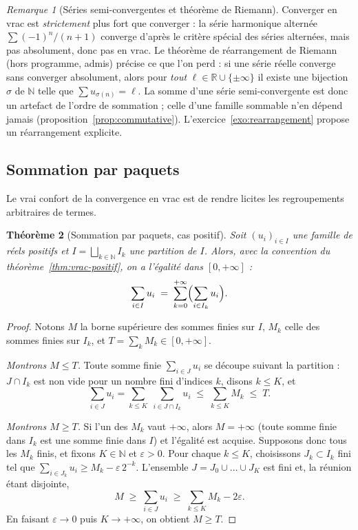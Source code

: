 \documentclass[11pt,a4paper]{article}
\theoremstyle{plain}
\newtheorem{theoreme}{Théorème}[section]
\theoremstyle{definition}
\theoremstyle{remark}
\newtheorem{remarque}[theoreme]{Remarque}
\newcommand{\R}{\mathbb{R}}
\newcommand{\N}{\mathbb{N}}
\newcommand{\eps}{\varepsilon}
\numberwithin{equation}{section}
\begin{document}
\begin{remarque}[Séries semi-convergentes et théorème de Riemann]\label{rem:riemann}
Converger en vrac est \emph{strictement} plus fort que converger : la
série harmonique alternée $\sum(-1)^{n}/(n+1)$ converge d'après le
critère spécial des séries alternées, mais pas absolument, donc pas en
vrac. Le théorème de réarrangement de Riemann (hors programme, admis)
précise ce que l'on perd : si une série réelle converge sans converger
absolument, alors pour \emph{tout} $\ell\in\R\cup\{\pm\infty\}$ il existe
une bijection $\sigma$ de $\N$ telle que $\sum u_{\sigma(n)}=\ell$. La
somme d'une série semi-convergente est donc un artefact de l'ordre de
sommation ; celle d'une famille sommable n'en dépend jamais
(proposition~\ref{prop:commutative}). L'exercice~\ref{exo:rearrangement}
propose un réarrangement explicite.
\end{remarque}

\subsection{Sommation par paquets}

Le vrai confort de la convergence en vrac est de rendre licites les
regroupements arbitraires de termes.

\begin{theoreme}[Sommation par paquets, cas positif]\label{thm:paquets}
Soit $(u_i)_{i\in I}$ une famille de réels positifs et
$I=\bigsqcup_{k\in\N}I_k$ une partition de $I$. Alors, avec la convention
du théorème~\ref{thm:vrac-positif}, on a l'égalité dans $[0,+\infty]$ :
\[
\sum_{i\in I}u_i \;=\; \sum_{k=0}^{+\infty}\Bigl(\sum_{i\in I_k}u_i\Bigr).
\]
\end{theoreme}

\begin{proof}
Notons $M$ la borne supérieure des sommes finies sur $I$, $M_k$ celle des
sommes finies sur $I_k$, et $T=\sum_k M_k\in[0,+\infty]$.

\emph{Montrons $M\leq T$.} Toute somme finie $\sum_{i\in J}u_i$ se découpe
suivant la partition : $J\cap I_k$ est non vide pour un nombre fini
d'indices $k$, disons $k\leq K$, et
\[
\sum_{i\in J}u_i=\sum_{k\leq K}\;\sum_{i\in J\cap I_k}u_i
\;\leq\;\sum_{k\leq K}M_k\;\leq\; T .
\]

\emph{Montrons $M\geq T$.} Si l'un des $M_k$ vaut $+\infty$, alors
$M=+\infty$ (toute somme finie dans $I_k$ est une somme finie dans $I$) et
l'égalité est acquise. Supposons donc tous les $M_k$ finis, et fixons
$K\in\N$ et $\eps>0$. Pour chaque $k\leq K$, choisissons $J_k\subset I_k$
fini tel que $\sum_{i\in J_k}u_i\geq M_k-\eps\,2^{-k}$. L'ensemble
$J=J_0\cup\dots\cup J_K$ est fini et, la réunion étant disjointe,
\[
M\;\geq\;\sum_{i\in J}u_i\;\geq\;\sum_{k\leq K}M_k-2\eps .
\]
En faisant $\eps\to 0$ puis $K\to+\infty$, on obtient $M\geq T$.
\end{proof}
\end{document}
